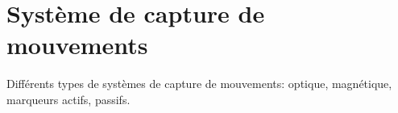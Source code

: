 \section{Syst\`eme de capture de mouvements}
\label{chap:basics:sec:mocap}

Diff\'erents types de syst\`emes de capture de mouvements:
optique, magn\'etique, marqueurs actifs, passifs.
